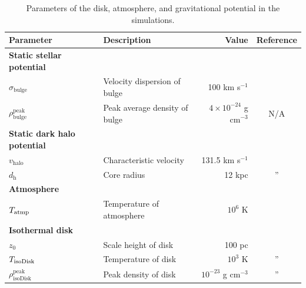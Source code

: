 \documentclass[fleqn,usenatbib,useAMS]{mnras}
\begin{document}
\begin{table}
\raggedright
\caption{Parameters of the disk, atmosphere, and gravitational potential in the simulations.}
\label{table-parameters}
\begin{tabular}{@{}llrc@{}}
\toprule[1pt]\midrule[0.3pt]
Parameter                             & Description                    & Value                                &  Reference                     \\ \midrule
{\bf Static stellar potential }       &                                &                                      &                                \\
$\sigma_{\text{bulge}}$               & Velocity dispersion of bulge   & 100 km s$^{-1}$                & \citep{velocity-dispersion-MW} \\
$\rho_{\text{bulge}}^{\text{peak}}$   & Peak average density of bulge  & $4\times 10^{-24}$ g cm$^{-3}$ &   N/A                          \\ \hline
{\bf Static dark halo potential }     &                                &                                      &                                \\
$v_{\text{halo}}$                     & Characteristic velocity        & 131.5 km s$^{-1}$              & \citep{Johnston1995}           \\
$d_{\text{h}}$                        & Core radius                    & 12 kpc                               & \multicolumn{1}{c}{''}         \\ \hline
{\bf Atmosphere }                     &                                &                                      &                                \\
$T_{\text{\text{atmp}}}$              & Temperature of atmosphere      & $10^{6}$ K                           & \citep{temperature-MW}         \\ \hline
{\bf Isothermal disk }                &                                &                                      &                                \\
$z_{0}$                               & Scale height of disk           & 100 pc                               & \citep{peak-ism-density}       \\
$T_{\text{\text{isoDisk}}}$           & Temperature of disk            & $10^{3}$ K                           & \multicolumn{1}{c}{''}         \\
$\rho_{\text{isoDisk}}^{\text{peak}}$ & Peak density of disk      & $10^{-23}$ g cm$^{-3}$         & \multicolumn{1}{c}{''}         \\ \hline

\end{tabular}
\end{table}
\end{document}
